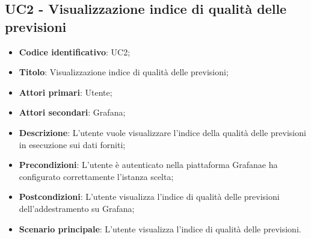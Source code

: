 \subsection{UC2 - Visualizzazione indice di qualità delle previsioni}
\begin{itemize}
	\item \textbf{Codice identificativo}: UC2;
	\item \textbf{Titolo}: Visualizzazione indice di qualità delle previsioni;
	\item \textbf{Attori primari}: Utente;
	\item \textbf{Attori secondari}: Grafana\glo;
	\item \textbf{Descrizione}: L'utente vuole visualizzare l'indice della qualità delle previsioni in esecuzione sui dati forniti;
	\item \textbf{Precondizioni}: L'utente è autenticato nella piattaforma Grafana\glosp e ha configurato correttamente l'istanza scelta;
	\item \textbf{Postcondizioni}: L'utente visualizza l'indice di qualità delle previsioni dell'addestramento su Grafana\glo;
	\item \textbf{Scenario principale}: L'utente visualizza l'indice di qualità delle previsioni.
\end{itemize}